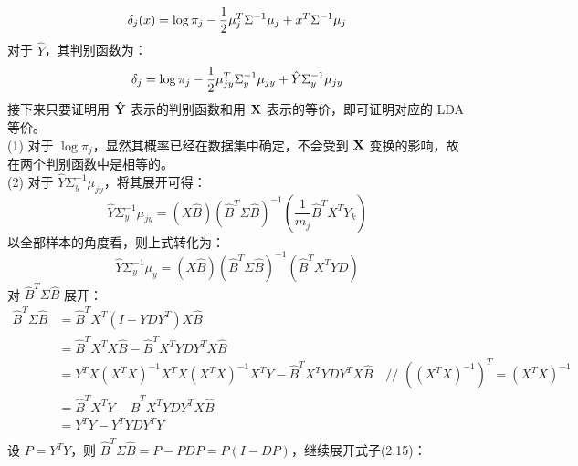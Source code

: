 \documentclass{article}
\begin{document}
    \begin{equation}
    \delta_j(x) = \log\pi_j - \frac{1}{2}\mu_j^T\Sigma^{-1}\mu_j + x^T\Sigma^{-1}\mu_j \\
    \end{equation}
    对于 $\hat{Y}$，其判别函数为：
    \begin{equation}
    \delta_j = \log\pi_j - \frac{1}{2}\mu_{jy}^T\Sigma_y^{-1}\mu_{jy} + \hat{Y}\Sigma_y^{-1}\mu_{jy} \\
    \end{equation}
    接下来只要证明用 $\bf \hat{Y}$ 表示的判别函数和用 $\bf X$ 表示的等价，即可证明对应的 LDA 等价。\\
    (1) 对于 $\log\pi_j$，显然其概率已经在数据集中确定，不会受到 $\bf X$ 变换的影响，故在两个判别函数中是相等的。\\
    (2) 对于 $\hat{Y}\Sigma_y^{-1}\mu_{jy}$，将其展开可得：
    \begin{equation}
    \hat{Y}\Sigma_y^{-1}\mu_{jy} = (X\hat{B}) (\hat{B}^T \Sigma \hat{B})^{-1} (\frac{1}{m_j}\hat{B}^T X^T Y_k)
    \end{equation}
    以全部样本的角度看，则上式转化为：
    \begin{equation}
    \hat{Y}\Sigma_y^{-1}\mu_{y} = (X\hat{B}) (\hat{B}^T \Sigma \hat{B})^{-1} (\hat{B}^T X^T YD)
    \end{equation}
    对 $\hat{B}^T \Sigma \hat{B}$ 展开：
    \begin{equation}
    \begin{aligned}
    \hat{B}^T \Sigma \hat{B}
    &= \hat{B}^T X^T (I - YDY^T) X \hat{B} \\
    &= \hat{B}^T X^T X\hat{B} - \hat{B}^T X^T YDY^T X\hat{B} \\
    &= Y^T X (X^T X)^{-1} X^T X (X^T X)^{-1} X^T Y - \hat{B}^T X^T YDY^T X\hat{B} \quad\text{// $((X^T X)^{-1})^T = (X^T X)^{-1}$} \\
    &= \hat{B}^T X^T Y - \hat{B}^T X^T YDY^T X\hat{B} \\
    &= Y^T Y - Y^T Y D Y^T Y \\
    \end{aligned}
    \end{equation}
    设 $P = Y^T Y$，则 $\hat{B}^T \Sigma \hat{B} = P - PDP = P(I - DP)$，继续展开式子(2.15)：\\
\end{document}
